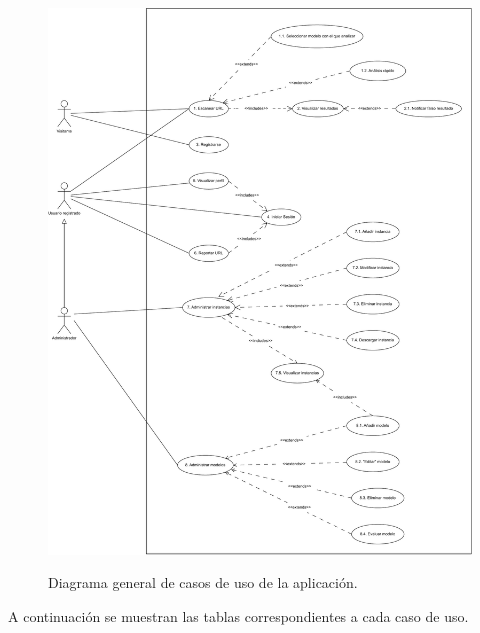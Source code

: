 \begin{figure}[h]
	\caption[Diagrama: casos de uso]{Diagrama general de casos de uso de la aplicación.}
	\centering
	\includegraphics[width=\textwidth]{../img/anexos/diagrams/cu}
	\label{b:diagrama-cu}
\end{figure}

A continuación se muestran las tablas correspondientes a cada caso de uso.

